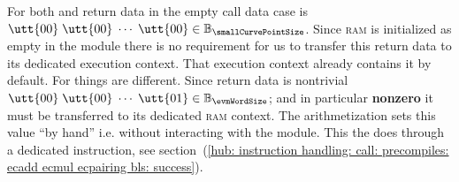 \saNote{}
For both \instEcadd{} and \instEcmul{} return data in the empty call data case is 
$\utt{00} \;
\utt{00} \; \cdots \;
\utt{00} \in \mathbb{B}_{\smallCurvePointSize}$.
Since \textsc{ram} is initialized as empty in the \mmuMod{} module there is no requirement for us to transfer this return data to its dedicated execution context.
That execution context already contains it by default.
For \instEcpairing{} things are different.
Since return data is nontrivial
$\utt{00} \;
\utt{00} \; \cdots \;
\utt{01} \in \mathbb{B}_{\evmWordSize}$;
and in particular \textbf{nonzero} it must be transferred to its dedicated \textsc{ram} context.
The arithmetization sets this value ``by hand'' i.e. without interacting with the \ecDataMod{} module.
This the \zkEvm{} does through a dedicated \mmuInstMstore{} instruction, see section~(\ref{hub: instruction handling: call: precompiles: ecadd ecmul ecpairing bls: success}).
